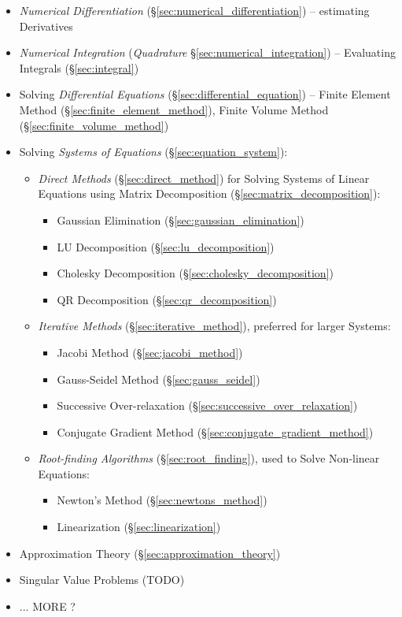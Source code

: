 {\begin{itemize}
  \item \emph{Numerical Differentiation} (\S\ref{sec:numerical_differentiation})
    -- estimating Derivatives
  \item \emph{Numerical Integration} (\emph{Quadrature}
    \S\ref{sec:numerical_integration}) -- Evaluating Integrals
    (\S\ref{sec:integral})
  \item Solving \emph{Differential Equations}
    (\S\ref{sec:differential_equation}) -- Finite Element Method
    (\S\ref{sec:finite_element_method}), Finite Volume Method
    (\S\ref{sec:finite_volume_method})
  \item Solving \emph{Systems of Equations} (\S\ref{sec:equation_system}):
    \begin{itemize}
      \item \emph{Direct Methods} (\S\ref{sec:direct_method}) for Solving
        Systems of Linear Equations using Matrix Decomposition
        (\S\ref{sec:matrix_decomposition}):
        \begin{itemize}
          \item Gaussian Elimination (\S\ref{sec:gaussian_elimination})
          \item LU Decomposition (\S\ref{sec:lu_decomposition})
          \item Cholesky Decomposition (\S\ref{sec:cholesky_decomposition})
          \item QR Decomposition (\S\ref{sec:qr_decomposition})
        \end{itemize}
      \item \emph{Iterative Methods} (\S\ref{sec:iterative_method}), preferred
        for larger Systems:
        \begin{itemize}
          \item Jacobi Method (\S\ref{sec:jacobi_method})
          \item Gauss-Seidel Method (\S\ref{sec:gauss_seidel})
          \item Successive Over-relaxation
            (\S\ref{sec:successive_over_relaxation})
          \item Conjugate Gradient Method
            (\S\ref{sec:conjugate_gradient_method})
        \end{itemize}
      \item \emph{Root-finding Algorithms} (\S\ref{sec:root_finding}), used to
        Solve Non-linear Equations:
        \begin{itemize}
          \item Newton's Method (\S\ref{sec:newtons_method})
          \item Linearization (\S\ref{sec:linearization})
        \end{itemize}
    \end{itemize}
  \item Approximation Theory (\S\ref{sec:approximation_theory})
  \item Singular Value Problems (TODO)
  \item ... MORE ?
\end{itemize}

}
